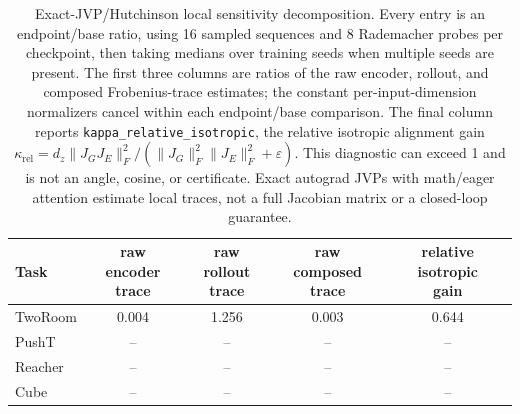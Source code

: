 \begin{table}[H]
\centering
\caption{Exact-JVP/Hutchinson local sensitivity decomposition. Every entry is an endpoint/base ratio, using 16 sampled sequences and 8 Rademacher probes per checkpoint, then taking medians over training seeds when multiple seeds are present. The first three columns are ratios of the raw encoder, rollout, and composed Frobenius-trace estimates; the constant per-input-dimension normalizers cancel within each endpoint/base comparison. The final column reports \texttt{kappa\_relative\_isotropic}, the relative isotropic alignment gain $\kappa_{\mathrm{rel}}=d_z\lVert J_GJ_E\rVert_F^2/(\lVert J_G\rVert_F^2\lVert J_E\rVert_F^2+\varepsilon)$. This diagnostic can exceed 1 and is not an angle, cosine, or certificate. Exact autograd JVPs with math/eager attention estimate local traces, not a full Jacobian matrix or a closed-loop guarantee.}
\label{tab:jvp-hutchinson-sensitivity-audit}
\small
\setlength{\tabcolsep}{3.5pt}
\begin{tabular}{lcccc}
\toprule
Task & \shortstack{raw encoder\\trace} & \shortstack{raw rollout\\trace} & \shortstack{raw composed\\trace} & \shortstack{relative isotropic\\gain} \\
\midrule
TwoRoom & 0.004 & 1.256 & 0.003 & 0.644 \\
PushT & -- & -- & -- & -- \\
Reacher & -- & -- & -- & -- \\
Cube & -- & -- & -- & -- \\
\bottomrule
\end{tabular}
\end{table}
